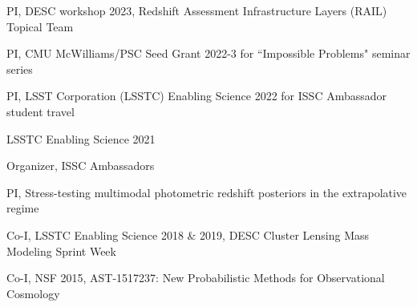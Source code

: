 \documentclass[11pt,letterpaper]{article}
\begin{document}
 \begin{list}{}{\malzlist}
 \item PI, DESC workshop 2023, Redshift Assessment Infrastructure Layers (RAIL) Topical Team
 \item PI, CMU McWilliams/PSC Seed Grant 2022-3 for ``Impossible Problems" seminar series
 \item PI, LSST Corporation (LSSTC) Enabling Science 2022 for ISSC Ambassador student travel
 \item LSSTC Enabling Science 2021
\begin{list}{}{\malzlist}
	\item Organizer, ISSC Ambassadors 
	\item PI, Stress-testing multimodal photometric redshift posteriors in the extrapolative regime
\end{list}
 \item Co-I, LSSTC Enabling Science 2018 \& 2019, DESC Cluster Lensing Mass Modeling Sprint Week%
\item Co-I, NSF 2015, AST-1517237: New Probabilistic Methods for Observational Cosmology
\end{list}

%
\clearpage
\end{document}
